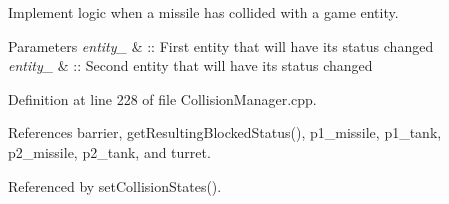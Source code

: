 Implement logic when a missile has collided with a game entity. 


\begin{DoxyParams}{Parameters}
{\em entity\-\_} & \-:\-: First entity that will have its status changed \\
\hline
{\em entity\-\_} & \-:\-: Second entity that will have its status changed \\
\hline
\end{DoxyParams}


Definition at line 228 of file Collision\-Manager.\-cpp.



References barrier, get\-Resulting\-Blocked\-Status(), p1\-\_\-missile, p1\-\_\-tank, p2\-\_\-missile, p2\-\_\-tank, and turret.



Referenced by set\-Collision\-States().


